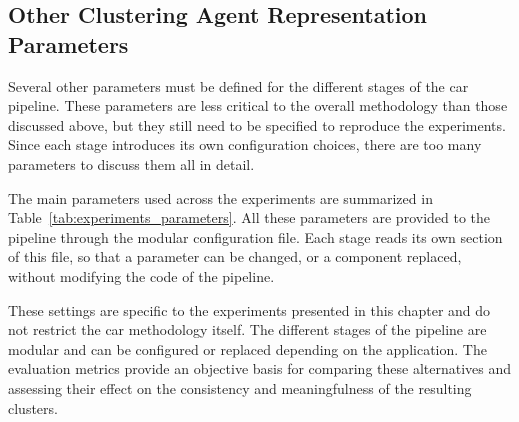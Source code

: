 

\subsection{Other Clustering Agent Representation Parameters}

Several other parameters must be defined for the different stages of the \gls{car} pipeline.
These parameters are less critical to the overall methodology than those discussed above, but they still need to be specified to reproduce the experiments.
Since each stage introduces its own configuration choices, there are too many parameters to discuss them all in detail.

The main parameters used across the experiments are summarized in Table~\ref{tab:experiments_parameters}.
All these parameters are provided to the pipeline through the modular configuration file.
Each stage reads its own section of this file, so that a parameter can be changed, or a component replaced, without modifying the code of the pipeline.



These settings are specific to the experiments presented in this chapter and do not restrict the \gls{car} methodology itself.
The different stages of the pipeline are modular and can be configured or replaced depending on the application.
The evaluation metrics provide an objective basis for comparing these alternatives and assessing their effect on the consistency and meaningfulness of the resulting clusters.
